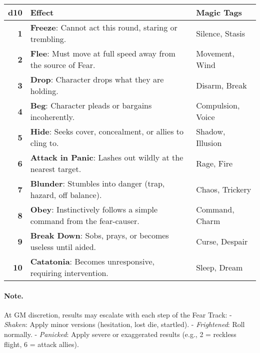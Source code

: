\begin{center}
\begin{tabular}{>{\bfseries}r l l}
\toprule
d10 & Effect & Magic Tags \\
\midrule
1 & \textbf{Freeze}: Cannot act this round, staring or trembling. & Silence, Stasis \\
2 & \textbf{Flee}: Must move at full speed away from the source of Fear. & Movement, Wind \\
3 & \textbf{Drop}: Character drops what they are holding. & Disarm, Break \\
4 & \textbf{Beg}: Character pleads or bargains incoherently. & Compulsion, Voice \\
5 & \textbf{Hide}: Seeks cover, concealment, or allies to cling to. & Shadow, Illusion \\
6 & \textbf{Attack in Panic}: Lashes out wildly at the nearest target. & Rage, Fire \\
7 & \textbf{Blunder}: Stumbles into danger (trap, hazard, off balance). & Chaos, Trickery \\
8 & \textbf{Obey}: Instinctively follows a simple command from the fear-causer. & Command, Charm \\
9 & \textbf{Break Down}: Sobs, prays, or becomes useless until aided. & Curse, Despair \\
10 & \textbf{Catatonia}: Becomes unresponsive, requiring intervention. & Sleep, Dream \\
\bottomrule
\end{tabular}
\end{center}

\paragraph{Note.}  
At GM discretion, results may escalate with each step of the Fear Track:  
- \emph{Shaken}: Apply minor versions (hesitation, lost die, startled).  
- \emph{Frightened}: Roll normally.  
- \emph{Panicked}: Apply severe or exaggerated results (e.g., 2 = reckless flight, 6 = attack allies).  
